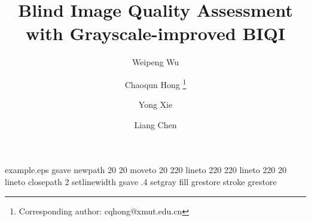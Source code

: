 %
%
%
%
%
\begin{filecontents*}{example.eps}
gsave
newpath
  20 20 moveto
  20 220 lineto
  220 220 lineto
  220 20 lineto
closepath
2 setlinewidth
gsave
  .4 setgray fill
grestore
stroke
grestore
\end{filecontents*}
%
\RequirePackage{fix-cm}
%
\documentclass[smallextended]{svjour3}       %
%
\smartqed  %
%
\usepackage{graphicx}
\usepackage[colorlinks,linkcolor=red]{hyperref}
%
%
%
%
%


\title{Blind Image Quality Assessment with Grayscale-improved BIQI%
}



\author{Weipeng Wu         \and
        Chaoqun Hong     \thanks{Corresponding author: cqhong@xmut.edu.cn}\and
        Yong Xie \and
        Liang Chen
}


